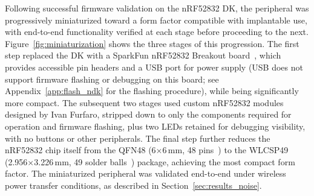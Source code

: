 Following successful firmware validation on the nRF52832 DK, the peripheral
was progressively miniaturized toward a form factor compatible with implantable
use, with end-to-end functionality verified at each stage before proceeding
to the next. Figure~\ref{fig:miniaturization} shows the three stages of this
progression. The first step replaced the DK with a SparkFun nRF52832 Breakout
board~\cite{sparkfun_nrf52832}, which provides accessible pin headers and a USB
port for power supply (USB does not support firmware flashing or debugging on
this board; see Appendix~\ref{app:flash_ndk} for the flashing procedure), while being significantly more
compact. The subsequent two stages used custom nRF52832 modules designed by
Ivan Furfaro, stripped down to only the components required for
operation and firmware flashing, plus two LEDs retained for debugging visibility,
with no buttons or other peripherals. The final
step further reduces the nRF52832 chip itself from the QFN48
(6$\times$6\,mm, 48 pins~\cite[p.~544]{nordic_nrf52832_ps}) to the WLCSP49
(2.956$\times$3.226\,mm, 49 solder balls~\cite[p.~545]{nordic_nrf52832_ps})
package, achieving the most compact form factor. The miniaturized
peripheral was validated end-to-end under wireless power transfer conditions,
as described in Section~\ref{sec:results_noise}.

